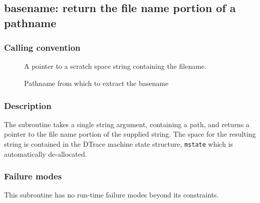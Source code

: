 \clearpage
{}
{}
\label{subr:basename}
\subsection*{basename: return the file name portion of a pathname}

\subsubsection*{Calling convention}

\begin{description}
\item[] A pointer to a scratch space string containing
  the filename.
\item[] Pathname from which to extract the basename
\end{description}

\subsubsection*{Description}

The  subroutine takes a single string argument,
containing a path, and returns a pointer to the file name portion of
the supplied string.  The space for the resulting string is contained
in the DTrace machine state structure, \verb|mstate| which is
automatically de-allocated.

\subsubsection*{Failure modes}

This subroutine has no run-time failure modes beyond its constraints.
